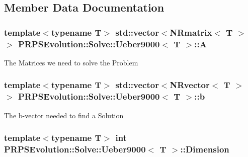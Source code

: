 \subsection{\-Member \-Data \-Documentation}
\hypertarget{struct_p_r_p_s_evolution_1_1_solve_1_1_ueber9000_a269888fd0617f5d4149957210b6a7ccc}{
\subsubsection[{\-A}]{\setlength{\rightskip}{0pt plus 5cm}template$<$typename \-T$>$ std\-::vector$<$\-N\-Rmatrix$<$ \-T $>$ $>$ {\bf \-P\-R\-P\-S\-Evolution\-::\-Solve\-::\-Ueber9000}$<$ \-T $>$\-::{\bf \-A}}}\label{struct_p_r_p_s_evolution_1_1_solve_1_1_ueber9000_a269888fd0617f5d4149957210b6a7ccc}
\-The \-Matrices we need to solve the \-Problem \hypertarget{struct_p_r_p_s_evolution_1_1_solve_1_1_ueber9000_aef9c195d69ce0feec1f005062eaa7f79}{
\subsubsection[{b}]{\setlength{\rightskip}{0pt plus 5cm}template$<$typename \-T$>$ std\-::vector$<$\-N\-Rvector$<$ \-T $>$ $>$ {\bf \-P\-R\-P\-S\-Evolution\-::\-Solve\-::\-Ueber9000}$<$ \-T $>$\-::{\bf b}}}\label{struct_p_r_p_s_evolution_1_1_solve_1_1_ueber9000_aef9c195d69ce0feec1f005062eaa7f79}
\-The b-\/vector needed to find a \-Solution \hypertarget{struct_p_r_p_s_evolution_1_1_solve_1_1_ueber9000_a9cf3886c2996dcd383d8f6c59384d885}{
\subsubsection[{\-Dimension}]{\setlength{\rightskip}{0pt plus 5cm}template$<$typename \-T$>$ int {\bf \-P\-R\-P\-S\-Evolution\-::\-Solve\-::\-Ueber9000}$<$ \-T $>$\-::{\bf \-Dimension}}}\label{struct_p_r_p_s_evolution_1_1_solve_1_1_ueber9000_a9cf3886c2996dcd383d8f6c59384d885}
